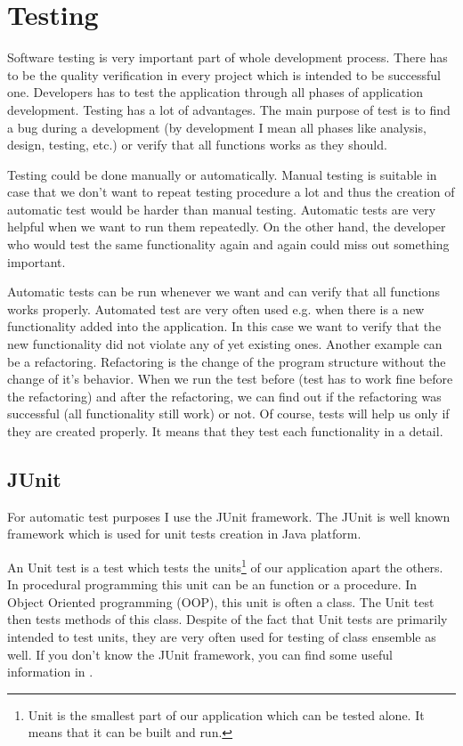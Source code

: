 \chapter{Testing}

Software testing is very important part of whole development process. There has to be the quality verification in every project which is intended to be successful one. Developers has to test the application through all phases of application development. Testing has a lot of advantages. The main purpose of test is to find a bug during a development (by development I mean all phases like analysis, design, testing, etc.) or verify that all functions works as they should. 

Testing could be done manually or automatically. Manual testing is suitable in case that we don't want to repeat testing procedure a lot and thus the creation of automatic test would be harder than manual testing. Automatic tests are very helpful when we want to run them repeatedly. On the other hand, the developer who would test the same functionality again and again could miss out something important.

Automatic tests can be run whenever we want and can verify that all functions works properly. Automated test are very often used e.g. when there is a new functionality added into the application. In this case we want to verify that the new functionality did not violate any of yet existing ones. Another example can be a refactoring. Refactoring is the change of the program structure without the change of it's behavior. When we run the test before (test has to work fine before the refactoring) and after the refactoring, we can find out if the refactoring was successful (all functionality still work) or not. Of course, tests will help us only if they are created properly. It means that they test each functionality in a detail.

\section{JUnit}

For automatic test purposes I use the JUnit framework. The JUnit is well known framework which is used for unit tests creation in Java platform.

An Unit test is a test which tests the units\footnote{Unit is the smallest part of our application which can be tested alone. It means that it can be built and run.} of our application apart the others. In procedural programming this unit can be an function or a procedure. In Object Oriented programming (OOP), this unit is often a class. The Unit test then tests methods of this class. Despite of the fact that Unit tests are primarily intended to test units, they are very often used for testing of class ensemble as well. If you don't know the JUnit framework, you can find some useful information in \cite{JUnitWeb}.

